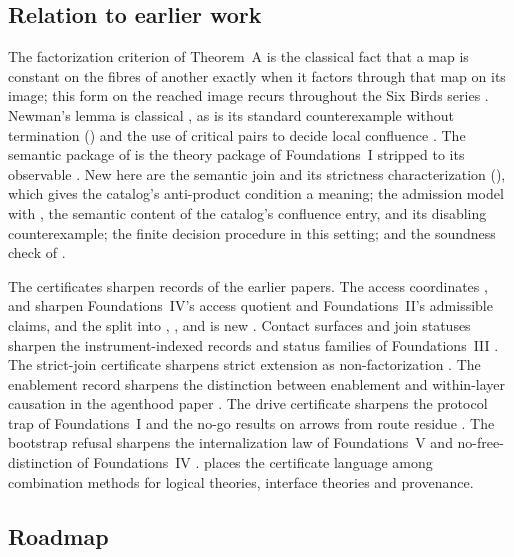 \subsection{Relation to earlier work}
\label{sec:intro-earlier}

The factorization criterion of Theorem~A is the classical fact that a map is constant on
the fibres of another exactly when it factors through that map on its image; this form on
the reached image recurs throughout the Six Birds series \citep{TsiokosFoundationsIV}.
Newman's lemma is classical \citep{Newman1942}, as is its standard counterexample without
termination () and the use of critical pairs to decide local
confluence \citep{KnuthBendix1970,Huet1980}. The semantic package of
 is the theory package of Foundations~I stripped to its observable
\citep{TsiokosFoundationsI}. New here are the semantic join and its strictness
characterization (), which gives the catalog's anti-product
condition a meaning; the admission model with , the semantic content
of the catalog's confluence entry, and its disabling counterexample; the finite decision
procedure in this setting; and the soundness check of .

The certificates sharpen records of the earlier papers. The access coordinates
\exposed, \recoverable{} and \admissible{} sharpen Foundations~IV's access quotient and
Foundations~II's admissible claims, and the split into \expressible, \present,
\reachable{} and \occurrent{} is new \citep{TsiokosFoundationsIV,TsiokosFoundationsII}.
Contact surfaces and join statuses sharpen the instrument-indexed records and status
families of Foundations~III \citep{TsiokosFoundationsIII}. The strict-join certificate
sharpens strict extension as non-factorization
\citep{TsiokosFoundationsIV,TsiokosFoundationsIII,TsiokosStrictTest}. The enablement
record sharpens the distinction between enablement and within-layer causation in the
agenthood paper \citep{TsiokosAgents}. The drive certificate sharpens the protocol trap of
Foundations~I and the no-go results on arrows from route residue
\citep{TsiokosFoundationsI,TsiokosNoGo}. The bootstrap refusal sharpens the
internalization law of Foundations~V and no-free-distinction of Foundations~IV
\citep{TsiokosFoundationsV,TsiokosFoundationsIV}.  places the
certificate language among combination methods for logical theories, interface theories
and provenance.

\subsection{Roadmap}

